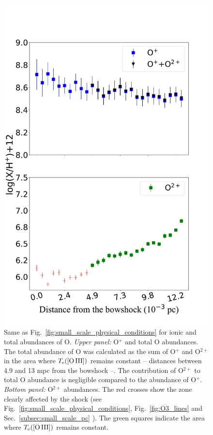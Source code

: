 \documentclass[twocolumn]{aastex63}
\newcommand{\jorge}[1]{{\color{magenta}J: #1}}
\newcommand{\cesar}[1]{{\color{red}C: #1}}
\begin{document}
\begin{figure}
\centering
\includegraphics[width=\columnwidth]{O_abundances.pdf}
\caption{Same as Fig.~\ref{fig:small_scale_physical_conditions} for ionic and total abundances of O. \textit{Upper panel:} O$^{+}$ and total O abundances. The total abundance of O was calculated as the sum of O$^{+}$ and O$^{2+}$ in the area where $T_{\rm e}(\text{[O\thinspace III]})$ remains constant -- distances between 4.9 and 13 mpc from the bowshock --. The contribution of O$^{2+}$ to total O abundance is negligible compared to the abundance of O$^{+}$. \textit{Bottom panel:} O$^{2+}$ abundances. The red crosses  show the zone clearly affected by the shock (see Fig.~\ref{fig:small_scale_physical_conditions}, Fig.~\ref{fig:O3_lines} and Sec.~\ref{subsec:small_scale_pc} ). The green squares indicate the area where $T_{\rm e}(\text{[O\thinspace III]})$ remains constant.} %
\label{fig:O_abundances}
\end{figure}
\end{document}
